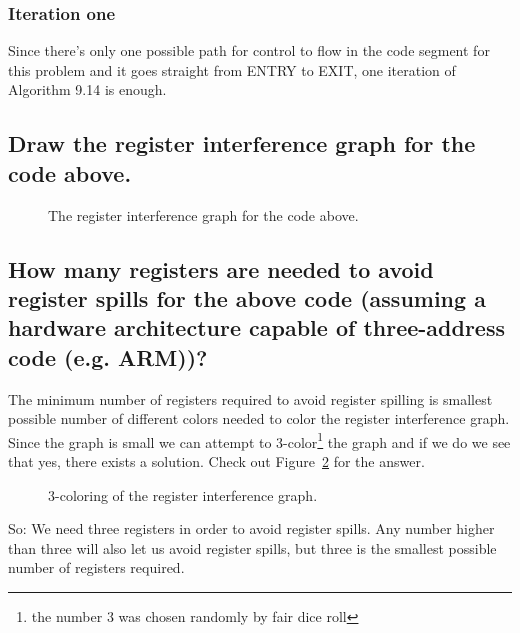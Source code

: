 \subsubsection{Iteration one}
\newcommand{\INBe}			{b, c}
\newcommand{\OUTBe}			{b, c}
\renewcommand{\INBone}		{b, c}
\renewcommand{\OUTBone}		{a, b}
\renewcommand{\INBtwo}		{a, b}
\renewcommand{\OUTBtwo}		{a, d}
\renewcommand{\INBthree}	{a, d}
\renewcommand{\OUTBthree}	{a, d}
\renewcommand{\INBfour}		{a, d}
\renewcommand{\OUTBfour}	{a, d, e}
\renewcommand{\INBfive}		{a, d, e}
\renewcommand{\OUTBfive}	{e}
\newcommand{\INBsix}		{e}
\newcommand{\OUTBsix}		{$\emptyset$}


Since there's only one possible path for control to flow in the code segment for this problem and it goes straight from ENTRY to EXIT, one iteration of Algorithm 9.14 is enough.


\subsection{Draw the register interference graph for the code above.}

\begin{figure}[H]
\centering

\caption{The register interference graph for the code above.}
\label{fig:4-c}
\end{figure}

\subsection{How many registers are needed to avoid register spills for the above code (assuming a hardware architecture capable of three-address code (e.g. ARM))?}
The minimum number of registers required to avoid register spilling is smallest possible number of different colors needed to color the register interference graph.
Since the graph is small we can attempt to 3-color\footnote{the number 3 was chosen randomly by fair dice roll} the graph and if we do we see that yes, there exists a solution.
Check out Figure~\ref{fig:4-d} for the answer.

\begin{figure}[H]
\centering

\caption{3-coloring of the register interference graph.}
\label{fig:4-d}
\end{figure}

So: We need three registers in order to avoid register spills.
Any number higher than three will also let us avoid register spills, but three is the smallest possible number of registers required.
